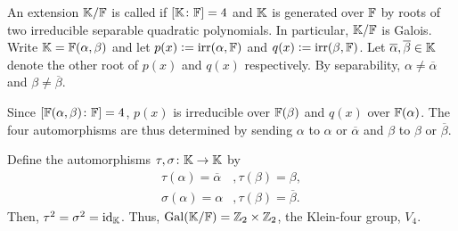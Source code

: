 \begin{ex}
    An extension $\mathbb{K}/\mathbb{F}$ is called  if $\left[ \mathbb{K} \colon \mathbb{F} \right] = 4$ and $\mathbb{K}$ is generated over $\mathbb{F}$ by roots of two irreducible separable quadratic polynomials. 
    In particular, $\mathbb{K}/\mathbb{F}$ is Galois. Write $\mathbb{K} = \mathbb{F}(\alpha, \beta)$ and let $p(x) \vcentcolon= \operatorname{irr}(\alpha, \mathbb{F})$ and $q(x) \vcentcolon= \operatorname{irr}(\beta,\mathbb{F})$. Let $\overline{\alpha}, \overline{\beta} \in \mathbb{K}$ denote the other root of $p(x)$ and $q(x)$ respectively. By separability, $\alpha \neq \overline{\alpha}$ and $\beta \neq \overline{\beta}$.
    
    Since $\left[ \mathbb{F}(\alpha,\beta) \colon \mathbb{F} \right] = 4$, $p(x)$ is irreducible over $\mathbb{F}(\beta)$ and $q(x)$ over $\mathbb{F}(\alpha)$. The four automorphisms are thus determined by sending $\alpha$ to $\alpha$ or $\overline{\alpha}$ and $\beta$ to $\beta$ or $\overline{\beta}$.
    
    Define the automorphisms $\tau, \sigma \colon \mathbb{K} \to \mathbb{K}$ by
    \begin{align*}
        \tau(\alpha) = \overline{\alpha}&, \tau(\beta) = \beta, \\
        \sigma(\alpha) = \alpha &, \tau(\beta) = \overline{\beta}.
    \end{align*}
    Then, $\tau^2 = \sigma^2 = \operatorname{id}_{\mathbb{K}}$. Thus, $\operatorname{Gal}(\mathbb{K}/\mathbb{F}) = \mathbb{Z}_2 \times \mathbb{Z}_2$, the Klein-four group, $V_4$. 
\end{ex}

